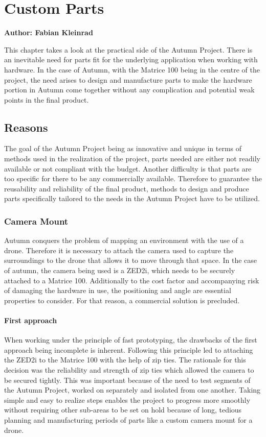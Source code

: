 \chapter{Custom Parts}

\textbf{Author: Fabian Kleinrad} 

This chapter takes a look at the practical side of the Autumn Project. There is an inevitable need for parts fit for the underlying application when working with hardware. In the case of Autumn, with the Matrice 100 being in the centre of the project, the need arises to design and manufacture parts to make the hardware portion in Autumn come together without any complication and potential weak points in the final product.

\section{Reasons}

The goal of the Autumn Project being as innovative and unique in terms of methods used in the realization of the project, parts needed are either not readily available or not compliant with the budget. Another difficulty is that parts are too specific for there to be any commercially available. Therefore to guarantee the reusability and reliability of the final product, methods to design and produce parts specifically tailored to the needs in the Autumn Project have to be utilized.

\subsection{Camera Mount}

Autumn conquers the problem of mapping an environment with the use of a drone. Therefore it is necessary to attach the camera used to capture the surroundings to the drone that allows it to move through that space. In the case of autumn, the camera being used is a ZED2i, which needs to be securely attached to a Matrice 100. Additionally to the cost factor and accompanying risk of damaging the hardware in use, the positioning and angle are essential properties to consider. For that reason, a commercial solution is precluded.

\subsubsection{First approach}

When working under the principle of fast prototyping, the drawbacks of the first approach being incomplete is inherent. Following this principle led to attaching the ZED2i to the Matrice 100 with the help of zip ties. The rationale for this decision was the reliability and strength of zip ties which allowed the camera to be secured tightly. This was important because of the need to test segments of the Autumn Project, worked on separately and isolated from one another. Taking simple and easy to realize steps enables the project to progress more smoothly without requiring other sub-areas to be set on hold because of long, tedious planning and manufacturing periods of parts like a custom camera mount for a drone.

